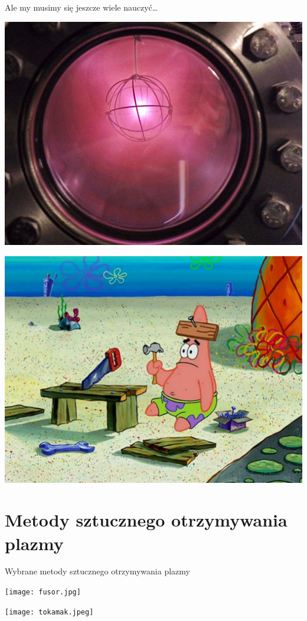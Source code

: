 \documentclass[10pt]{beamer}
\begin{document}
        \begin{frame}{Ale my musimy się jeszcze wiele nauczyć\dots}
            \begin{minipage}{0.49\textwidth}
                \centering
                \includegraphics[width=0.8\linewidth]{deuterium.jpg}
            \end{minipage}
            \hfill
            \begin{minipage}{0.49\textwidth}
                \centering
                \includegraphics[width=0.8\linewidth]{patrick.jpeg}
            \end{minipage}
        \end{frame}

    \section{Metody sztucznego otrzymywania plazmy}

    \begin{frame}{Wybrane metody sztucznego otrzymywania plazmy}
        \begin{minipage}{0.49\textwidth}
            \centering
            \texttt{[image: fusor.jpg]}
        \end{minipage}
        \hfill
        \begin{minipage}{0.49\textwidth}
            \centering
            \texttt{[image: tokamak.jpeg]}
        \end{minipage}
    \end{frame}
\end{document}
